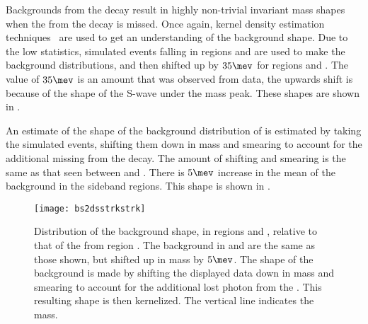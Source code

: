 Backgrounds from the decay \bstodskstrk result in highly non-trivial invariant mass shapes when the
\pip from the \Kstarz decay is missed.
Once again, kernel density estimation techniques~\cite{Cranmer:2000du} are used to get an
understanding of the background shape.
Due to the low statistics, simulated \bstodskstrk events falling in regions \rA and \rB are used to
make the background distributions, and then shifted up by $35\mev$ for regions \rC and \rD.
The value of $35\mev$ is an amount that was observed from data, the upwards shift is because of the
shape of the S-wave under the \phii mass peak.
These shapes are shown in .

An estimate of the shape of the background distribution of \bstodsstrkstrk is estimated by taking
the simulated \bstodskstrk events, shifting them down in mass and smearing to account for the
additional missing \photon from the \Dss decay.
The amount of shifting and smearing is the same as that seen between \btodsphi and \btodsstrphi.
There is $5\mev$ increase in the mean of the background in the \phii sideband regions.
This shape is shown in .


\begin{figure}
  \begin{center}
    \texttt{[image: bs2dsstrkstrk]}
    \caption[Shapes of the \bstodsstrkstrk background]
    {
      Distribution of the \bstodsstrkstrk background shape, in regions \rA and \rB, relative to
      that of the \bstodskstrk from region \rA.
      The \bstodsstrkstrk background in \rC and \rD are the same as those shown, but shifted up in
      mass by $5\mev$.
      The shape of the \bstodsstrkstrk background is made by shifting the displayed data down in
      mass and smearing to account for the additional lost photon from the \Dss.
      This resulting shape is then kernelized.
      The vertical line indicates the \Bp mass.
    }
    \label{fig:dsphi:bstodsstrkstrk}
  \end{center}
\end{figure}



